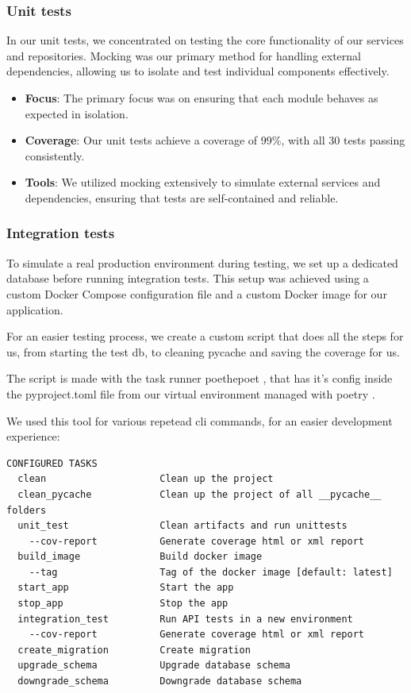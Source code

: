 \subsubsection{Unit tests}
In our unit tests, we concentrated on testing the core functionality of our services and repositories. Mocking was our primary method for handling external dependencies, allowing us to isolate and test individual components effectively.

\begin{itemize}
    \item \textbf{Focus}: The primary focus was on ensuring that each module behaves as expected in isolation.
    \item \textbf{Coverage}: Our unit tests achieve a coverage of 99\%, with all 30 tests passing consistently.
    \item \textbf{Tools}: We utilized mocking extensively to simulate external services and dependencies, ensuring that tests are self-contained and reliable.
\end{itemize}

\subsubsection{Integration tests}
To simulate a real production environment during testing, we set up a dedicated database before running integration tests. This setup was achieved using a custom Docker Compose configuration file and a custom Docker image for our application.

For an easier testing process, we create a custom script that does all the steps for us, from starting the test db, to cleaning pycache and saving the coverage for us.

The script is made with the task runner poethepoet \cite{poethepoet}, that has it's config inside the pyproject.toml file from our virtual environment managed with poetry \cite{poetry}.

We used this tool for various repetead cli commands, for an easier development experience:

\begin{lstlisting}[language={}]
CONFIGURED TASKS
  clean                    Clean up the project
  clean_pycache            Clean up the project of all __pycache__ folders
  unit_test                Clean artifacts and run unittests
    --cov-report           Generate coverage html or xml report
  build_image              Build docker image
    --tag                  Tag of the docker image [default: latest]
  start_app                Start the app
  stop_app                 Stop the app
  integration_test         Run API tests in a new environment
    --cov-report           Generate coverage html or xml report
  create_migration         Create migration
  upgrade_schema           Upgrade database schema
  downgrade_schema         Downgrade database schema
\end{lstlisting}


